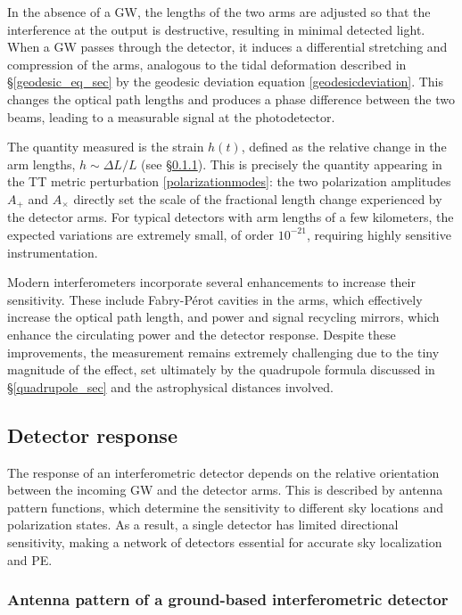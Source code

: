 In the absence of a GW, the lengths of the two arms are adjusted so that the interference at the output is destructive, resulting in minimal detected light. When a GW passes through the detector, it induces a differential stretching and compression of the arms, analogous to the tidal deformation described in \S\ref{geodesic_eq_sec} by the geodesic deviation equation \eqref{geodesicdeviation}. This changes the optical path lengths and produces a phase difference between the two beams, leading to a measurable signal at the photodetector.

The quantity measured is the strain $h(t)$, defined as the relative change in the arm lengths, $h \sim \Delta L / L$ (see \S\ref{antenna_patterns_sec}). This is precisely the quantity appearing in the TT metric perturbation \eqref{polarizationmodes}: the two polarization amplitudes $A_+$ and $A_\times$ directly set the scale of the fractional length change experienced by the detector arms. For typical detectors with arm lengths of a few kilometers, the expected variations are extremely small, of order $10^{-21}$, requiring highly sensitive instrumentation.

Modern interferometers incorporate several enhancements to increase their sensitivity. These include Fabry-Pérot cavities in the arms, which effectively increase the optical path length, and power and signal recycling mirrors, which enhance the circulating power and the detector response. Despite these improvements, the measurement remains extremely challenging due to the tiny magnitude of the effect, set ultimately by the quadrupole formula discussed in \S\ref{quadrupole_sec} and the astrophysical distances involved.


\subsection{Detector response}

The response of an interferometric detector depends on the relative orientation between the incoming GW and the detector arms. This is described by antenna pattern functions, which determine the sensitivity to different sky locations and polarization states. As a result, a single detector has limited directional sensitivity, making a network of detectors essential for accurate sky localization and PE.


\subsubsection{Antenna pattern of a ground-based interferometric detector}
\label{antenna_patterns_sec}

